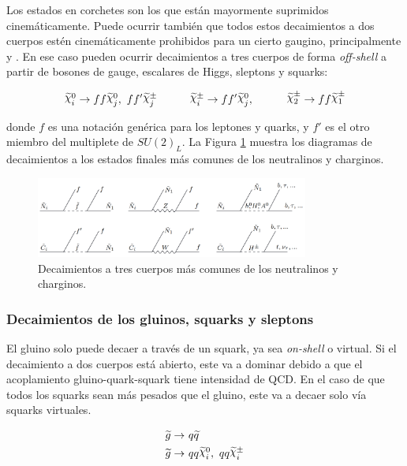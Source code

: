 Los estados en corchetes son los que están mayormente suprimidos cinemáticamente. Puede ocurrir también que todos estos decaimientos a dos cuerpos estén cinemáticamente prohibidos para un cierto gaugino, principalmente \chinoonepm y \ninotwo. En ese caso pueden ocurrir decaimientos a tres cuerpos de forma \textit{off-shell} a partir de bosones de gauge, escalares de Higgs, sleptons y squarks:

\begin{equation}
	\ggino^0_i \to ff\ggino^0_j,\ ff'\ggino^\pm_j \quad\quad\quad \ggino^\pm_i \to ff'\ggino^0_j,\quad\quad\quad \chinotwopm \to ff\chinoonepm
\end{equation}

\noindent
donde $f$ es una notación genérica para los leptones y quarks, y $f'$ es el otro miembro del multiplete de $SU(2)_L$. La Figura \ref{fig:susy_three_body_decays} muestra los diagramas de decaimientos a los estados finales más comunes de los neutralinos y charginos.



\begin{figure}[H]
  \centering
  \includegraphics[width=0.8\textwidth]{images/theory/nc_decays.png}
  \caption{Decaimientos a tres cuerpos más comunes de los neutralinos y charginos.}
  \label{fig:susy_three_body_decays}
\end{figure}

\subsubsection{Decaimientos de los gluinos, squarks y sleptons}

El gluino solo puede decaer a través de un squark, ya sea \textit{on-shell} o virtual. Si el decaimiento a
dos cuerpos está abierto, este va a dominar debido a que el acoplamiento gluino-quark-squark tiene intensidad de QCD.
En el caso de que todos los squarks sean más pesados que el gluino, este va a decaer solo vía
squarks virtuales.



\begin{equation}
	\begin{split}
		\gluino\to &\ q\squark \\
		\gluino\to &\ qq\ggino^0_i,\ qq\ggino^\pm_i \\
	\end{split}
	\label{eq:gluino_dec}
\end{equation}


